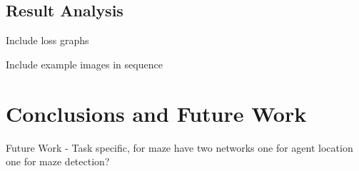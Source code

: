 \documentclass[12pt,american]{report}
\begin{document}
\section{Result Analysis}
Include loss graphs

Include example images in sequence


\chapter{Conclusions and Future Work}
\label{sec:conclusions}


Future Work
- Task specific, for maze have two networks one for agent location one for maze detection?


  \nocite{*}


\begin{singlespace}

\end{singlespace}

\appendix
\end{document}
